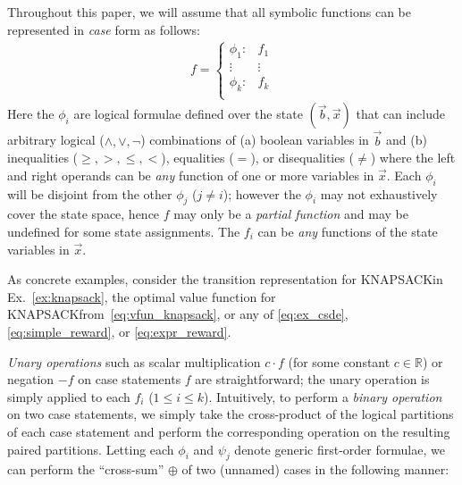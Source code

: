 \documentclass[letterpaper]{article}
\begin{document}
Throughout this paper, we will assume that all symbolic functions
can be represented in \emph{case} form as follows:
{%
\begin{align*}
f = 
\begin{cases}
  \phi_1: & f_1 \\ 
 \vdots&\vdots\\ 
  \phi_k: & f_k \\ 
\end{cases}
\end{align*}
}
Here the $\phi_i$ are logical formulae defined over the state
$(\vec{b},\vec{x})$ that can include arbitrary logical ($\land,\lor,\neg$)
combinations of (a) boolean variables in $\vec{b}$ and (b) 
inequalities ($\geq,>,\leq,<$), equalities ($=$), or disequalities ($\neq$)
where the left and right operands can be \emph{any} function of one or more 
variables in $\vec{x}$.  
Each $\phi_i$ will be disjoint from the other $\phi_j$ ($j \neq i$); 
however the $\phi_i$ may not exhaustively cover the state space, hence
$f$ may only be a \emph{partial function} and may be undefined for some
state assignments.
The $f_i$ can be \emph{any} functions of the state
variables in $\vec{x}$.  

As concrete examples, consider the transition representation for
KNAPSACKin Ex.~\ref{ex:knapsack}, the optimal value function for
KNAPSACKfrom~\eqref{eq:vfun_knapsack}, or any of
\eqref{eq:ex_csde}, \eqref{eq:simple_reward}, or \eqref{eq:expr_reward}.

\emph{Unary operations} such as scalar multiplication $c\cdot f$ (for
some constant $c \in \mathbb{R}$) or negation $-f$ on case statements
$f$ are straightforward; the unary operation is simply applied to each
$f_i$ ($1 \leq i \leq k$). Intuitively, to perform a \emph{binary
  operation} on two case statements, we simply take the cross-product
of the logical partitions of each case statement and perform the
corresponding operation on the resulting paired partitions.  Letting
each $\phi_i$ and $\psi_j$ denote generic first-order formulae, we can
perform the ``cross-sum'' $\oplus$ of two (unnamed) cases in the
following manner:
\end{document}
